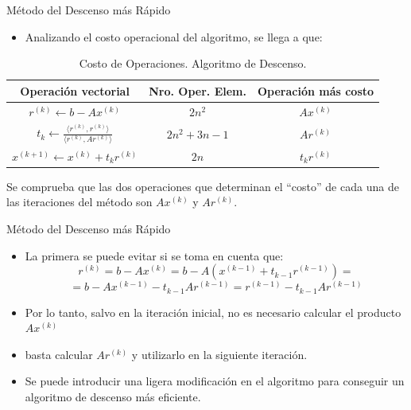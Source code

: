 \documentclass[10pt]{beamer}
\begin{document}
\begin{frame}{M\'etodo del Descenso m\'as R\'apido}
  \begin{itemize}
    \item<1->Analizando el costo operacional del algoritmo, se llega a que: 
  \end{itemize}
  \begin{table}[ht]
    \begin{center}
     \begin{tabular}{|c|c|c|}\hline
     Operaci\'on vectorial & Nro. Oper. Elem. & Operaci\'on m\'as costo\\\hline
     $r^{(k)} \leftarrow b-Ax^{(k)}$ & $2n^2$ & $Ax^{(k)}$\\[5pt]
    $t_k \leftarrow \displaystyle\frac{\langle r^{(k)},r^{(k)}\rangle}{\langle r^{(k)},Ar^{(k)}\rangle}$ & $2n^2+3n-1 $ & $Ar^{(k)}$\\[10pt]
    $x^{(k+1)} \leftarrow x^{(k)}+t_kr^{(k)}$ & $2n$ & $t_kr^{(k)}$\\\hline
    \end{tabular}
    \caption{Costo de Operaciones. Algoritmo de Descenso.}
    \end{center}
    \end{table}
    Se comprueba que las dos operaciones que determinan el ``costo'' de cada una de
las iteraciones del m\'etodo son $Ax^{(k)}$ y $Ar^{(k)}$.
\end{frame}
\begin{frame}{M\'etodo del Descenso m\'as R\'apido}
  \begin{itemize}
    \item<1->La primera se puede evitar si se toma en cuenta que:
    $$
     r^{(k)} = b - Ax^{(k)} = b- A(x^{(k-1)}+t_{k-1}r^{(k-1)}) = 
     $$
     $$
     =b - Ax^{(k-1)} - t_{k-1}Ar^{(k-1)} = r^{(k-1)} - t_{k-1}Ar^{(k-1)}
    $$
    \item<2->Por lo tanto, salvo en la iteraci\'on inicial, no es necesario calcular el producto $Ax^{(k)}$
    \item<3->basta calcular $Ar^{(k)}$ y utilizarlo en la siguiente iteraci\'on.
    \item <4->Se puede introducir una ligera modificaci\'on en el algoritmo para conseguir un algoritmo de descenso m\'as eficiente.
  \end{itemize}
\end{frame}
\end{document}
